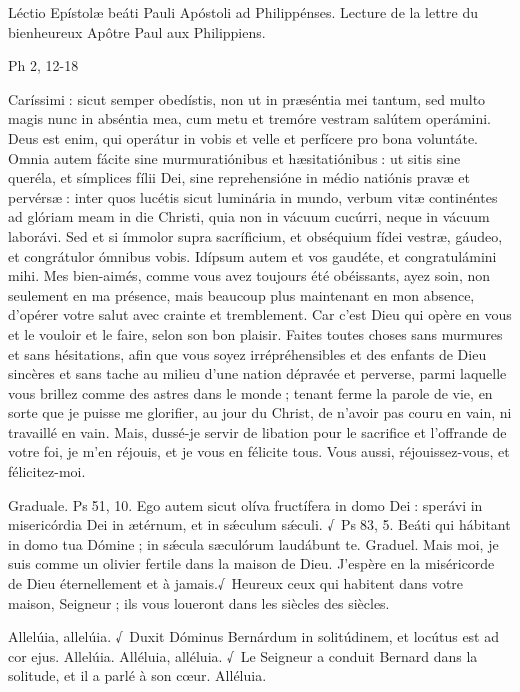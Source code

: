 \begin{paracol}{2}
Léctio Epístolæ beáti Pauli Apóstoli ad Philippénses.
\switchcolumn
Lecture de la lettre du bienheureux Apôtre Paul aux Philippiens.
\switchcolumn*

Ph 2, 12-18
\switchcolumn

\switchcolumn*

Caríssimi : sicut semper obedístis,  non ut in præséntia mei tantum, sed multo magis nunc in abséntia mea, cum metu et tremóre vestram salútem operámini. Deus est enim, qui operátur in vobis et velle et perfícere pro bona voluntáte. Omnia autem fácite sine murmuratiónibus et hæsitatiónibus : ut sitis sine queréla, et símplices fílii Dei, sine reprehensióne in médio natiónis pravæ et pervérsæ : inter quos lucétis sicut luminária in mundo, verbum vitæ continéntes ad glóriam meam in die Christi, quia non in vácuum cucúrri, neque in vácuum laborávi. Sed et si ímmolor supra sacríficium, et obséquium fídei vestræ, gáudeo, et congrátulor ómnibus vobis. Idípsum autem et vos gaudéte, et congratulámini mihi.
\switchcolumn
Mes bien-aimés, comme vous avez toujours été obéissants, ayez soin, non seulement en ma présence, mais beaucoup plus maintenant en mon absence, d’opérer votre salut avec crainte et tremblement. Car c’est Dieu qui opère en vous et le vouloir et le faire, selon son bon plaisir. Faites toutes choses sans murmures et sans hésitations,  afin que vous soyez irrépréhensibles et des enfants de Dieu sincères et sans tache au milieu d’une nation dépravée et perverse, parmi laquelle vous brillez comme des astres dans le monde ; tenant ferme la parole de vie, en sorte que je puisse me glorifier, au jour du Christ, de n’avoir pas couru en vain, ni travaillé en vain. Mais, dussé-je servir de libation pour le sacrifice et l’offrande de votre foi, je m’en réjouis, et je vous en félicite tous. Vous aussi, réjouissez-vous, et félicitez-moi.
\switchcolumn*

Graduale. Ps 51, 10. Ego autem sicut olíva fructífera in domo Dei : sperávi in misericórdia Dei in ætérnum, et in sǽculum sǽculi. √~Ps 83, 5. Beáti qui hábitant in domo tua Dómine ; in sǽcula sæculórum laudábunt te.
\switchcolumn
Graduel. Mais moi, je suis comme un olivier fertile dans la maison de Dieu. J’espère en la miséricorde de Dieu éternellement et à jamais.√~Heureux ceux qui habitent dans votre maison, Seigneur ; ils vous loueront dans les siècles des siècles.
\switchcolumn*

Allelúia, allelúia. √~Duxit Dóminus Bernárdum in solitúdinem, et locútus est ad cor ejus. Allelúia.
\switchcolumn
Alléluia, alléluia. √~Le Seigneur a conduit Bernard dans la solitude, et il a parlé à son cœur. Alléluia.
\switchcolumn*


\end{paracol}
